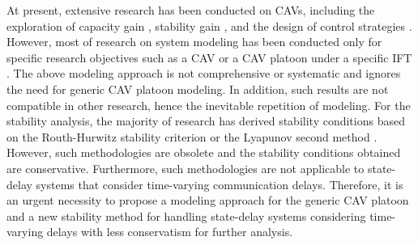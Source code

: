 \documentclass[a4paper]{cas-sc}
\begin{document}
At present, extensive research has been conducted on CAVs, including the exploration of capacity gain \citep{sala_capacity_2021,Chang2020}, stability gain \citep{Zhou2019,Montanino2021}, and the design of control strategies \citep{Zhu2019,Yu2021}. However, most of research on system modeling has been conducted only for specific research objectives such as a CAV \citep{Wei2017,Navas2016,Milanes2014a} or a CAV platoon under a specific IFT \citep{wang_leading_2021,Hengster-Movric2015}. The above modeling approach is not comprehensive or systematic and ignores the need for generic CAV platoon modeling. In addition, such results are not compatible in other research, hence the inevitable repetition of modeling. For the stability analysis, the majority of research has derived stability conditions based on the Routh-Hurwitz stability criterion or the Lyapunov second method \citep{Zheng2015,sun_stability_2018,zheng_influence_2014}. However, such methodologies are obsolete and the stability conditions obtained are conservative. Furthermore, such methodologies are not applicable to state-delay systems that consider time-varying communication delays. Therefore, it is an urgent necessity to propose a modeling approach for the generic CAV platoon and a new stability method for handling state-delay systems considering time-varying delays with less conservatism for further analysis.
\end{document}
